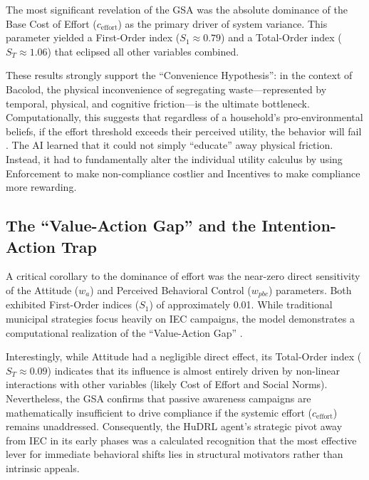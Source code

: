 The most significant revelation of the GSA was the absolute dominance of the Base Cost of Effort ($c_{\text{effort}}$) as the primary driver of system variance. This parameter yielded a First-Order index ($S_1 \approx 0.79$) and a Total-Order index ($S_T \approx 1.06$) that eclipsed all other variables combined. %

These results strongly support the ``Convenience Hypothesis'': in the context of Bacolod, the physical inconvenience of segregating waste—represented by temporal, physical, and cognitive friction—is the ultimate bottleneck. Computationally, this suggests that regardless of a household's pro-environmental beliefs, if the effort threshold exceeds their perceived utility, the behavior will fail \citep{Corcoran2020}. The AI learned that it could not simply ``educate'' away physical friction. Instead, it had to fundamentally alter the individual utility calculus by using Enforcement to make non-compliance costlier and Incentives to make compliance more rewarding.

\subsection{The ``Value-Action Gap'' and the Intention-Action Trap}

A critical corollary to the dominance of effort was the near-zero direct sensitivity of the Attitude ($w_a$) and Perceived Behavioral Control ($w_{pbc}$) parameters. Both exhibited First-Order indices ($S_1$) of approximately 0.01. While traditional municipal strategies focus heavily on IEC campaigns, the model demonstrates a computational realization of the ``Value-Action Gap'' \citep{Liao2024, Zhao2022}.

Interestingly, while Attitude had a negligible direct effect, its Total-Order index ($S_T \approx 0.09$) indicates that its influence is almost entirely driven by non-linear interactions with other variables (likely Cost of Effort and Social Norms). Nevertheless, the GSA confirms that passive awareness campaigns are mathematically insufficient to drive compliance if the systemic effort ($c_{\text{effort}}$) remains unaddressed. Consequently, the HuDRL agent's strategic pivot away from IEC in its early phases was a calculated recognition that the most effective lever for immediate behavioral shifts lies in structural motivators rather than intrinsic appeals.

